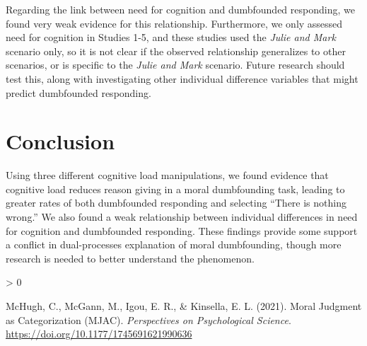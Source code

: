 \documentclass[
  american,
  man,floatsintext]{apa7}
\newlength{\cslhangindent}
\newenvironment{CSLReferences}[2] %
 {%
  \setlength{\parindent}{0pt}
  \ifodd #1 \everypar{\setlength{\hangindent}{\cslhangindent}}\ignorespaces\fi
  \ifnum #2 > 0
  \setlength{\parskip}{#2\baselineskip}
  \fi
 }%
 {}
\begin{document}
Regarding the link between need for cognition and dumbfounded responding, we found very weak evidence for this relationship. Furthermore, we only assessed need for cognition in Studies 1-5, and these studies used the \emph{Julie and Mark} scenario only, so it is not clear if the observed relationship generalizes to other scenarios, or is specific to the \emph{Julie and Mark} scenario. Future research should test this, along with investigating other individual difference variables that might predict dumbfounded responding.

\hypertarget{conclusion}{%
\section{Conclusion}\label{conclusion}}

Using three different cognitive load manipulations, we found evidence that cognitive load reduces reason giving in a moral dumbfounding task, leading to greater rates of both dumbfounded responding and selecting ``There is nothing wrong.'' We also found a weak relationship between individual differences in need for cognition and dumbfounded responding. These findings provide some support a conflict in dual-processes explanation of moral dumbfounding, though more research is needed to better understand the phenomenon.

\hypertarget{refs}{}
\begin{CSLReferences}{1}{0}
\leavevmode\hypertarget{ref-mchugh_moral_2021}{}%
McHugh, C., McGann, M., Igou, E. R., \& Kinsella, E. L. (2021). Moral {Judgment} as {Categorization} ({MJAC}). \emph{Perspectives on Psychological Science}. \url{https://doi.org/10.1177/1745691621990636}

\end{CSLReferences}
\end{document}
